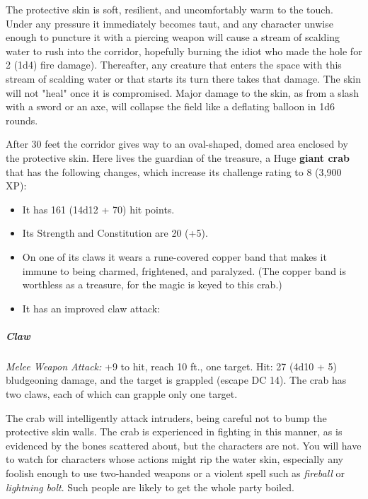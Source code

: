 \documentclass[10pt,a4paper,twoside,bg=print,twocolumn,openany,nodeprecatedcode]{dndbook}
\begin{document}
The protective skin is soft, resilient, and uncomfortably warm to the touch. Under any pressure it immediately becomes taut, and any character unwise enough to puncture it with a piercing weapon will cause a stream of scalding water to rush into the corridor, hopefully burning the idiot who made the hole for 2 (1d4) fire damage). Thereafter, any creature that enters the space with this stream of scalding water or that starts its turn there takes that damage. The skin will not "heal" once it is compromised. Major damage to the skin, as from a slash with a sword or an axe, will collapse the field like a deflating balloon in 1d6 rounds.

After 30 feet the corridor gives way to an oval-shaped, domed area enclosed by the protective skin. Here lives the guardian of the treasure, a Huge \textbf{giant crab} that has the following changes, which increase its challenge rating to 8 (3,900 XP):


\begin{itemize}
\item It has 161 (14d12 + 70) hit points.
\item Its Strength and Constitution are 20 (+5).
\item On one of its claws it wears a rune-covered copper band that makes it immune to being charmed, frightened, and paralyzed. (The copper band is worthless as a treasure, for the magic is keyed to this crab.)
\item It has an improved claw attack:
\end{itemize}

\begin{DndSidebar}[float=!b]{}
\subparagraph{Claw}
\textsl{Melee Weapon Attack:} +9 to hit, reach 10 ft., one target. Hit: 27 (4d10 + 5) bludgeoning damage, and the target is grappled (escape DC 14). The crab has two claws, each of which can grapple only one target.



\end{DndSidebar}

The crab will intelligently attack intruders, being careful not to bump the protective skin walls. The crab is experienced in fighting in this manner, as is evidenced by the bones scattered about, but the characters are not. You will have to watch for characters whose actions might rip the water skin, especially any foolish enough to use two-handed weapons or a violent spell such as \textit{fireball} or \textit{lightning bolt}. Such people are likely to get the whole party boiled.
\end{document}
